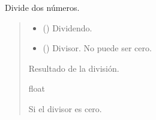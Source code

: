 \documentclass[a4paper,10pt,spanish]{sphinxmanual}
\begin{document}
\begin{fulllineitems}
\label{\detokenize{1_configuracion_inicial/src:src.operaciones.division}}
\pysigstartsignatures
\pysiglinewithargsret
{}
{\sphinxparamcomma {}}
{}
\pysigstopsignatures
\sphinxAtStartPar
Divide dos números.
\begin{quote}\begin{description}
\begin{itemize}
\item {} 
\sphinxAtStartPar
{} () \textendash{} Dividendo.

\item {} 
\sphinxAtStartPar
{} () \textendash{} Divisor. No puede ser cero.

\end{itemize}

\sphinxAtStartPar
Resultado de la división.

\sphinxAtStartPar
float

\sphinxAtStartPar
{} \textendash{} Si el divisor es cero.

\end{description}\end{quote}

\end{fulllineitems}

\end{document}
